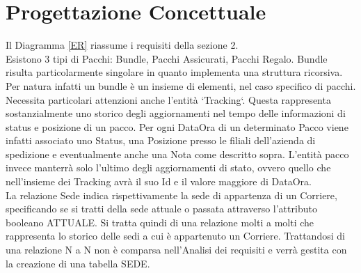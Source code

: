 \section{Progettazione Concettuale}

Il Diagramma \ref{ER} riassume i requisiti della sezione 2.\\ Esistono 3 tipi di Pacchi: Bundle, Pacchi Assicurati, Pacchi Regalo.
Bundle risulta particolarmente singolare in quanto implementa una struttura ricorsiva. Per natura infatti un bundle è un insieme di elementi, nel caso specifico di pacchi.\\
Necessita particolari attenzioni anche l'entità `Tracking`. Questa rappresenta sostanzialmente uno storico degli aggiornamenti nel tempo delle informazioni di status e posizione di un pacco. Per ogni DataOra di un determinato Pacco viene infatti associato uno Status, una Posizione presso le filiali dell'azienda di spedizione e eventualmente anche una Nota come descritto sopra. L'entità pacco invece manterrà solo l'ultimo degli aggiornamenti di stato, ovvero quello che nell'insieme dei Tracking avrà il suo Id e il valore maggiore di DataOra.\\
La relazione Sede indica rispettivamente la sede di appartenza di un Corriere, specificando se si tratti della sede attuale o passata attraverso l'attributo booleano ATTUALE. Si tratta quindi di una relazione molti a molti che rappresenta lo storico delle sedi a cui è appartenuto un Corriere. Trattandosi di una relazione N a N non è comparsa nell'Analisi dei requisiti e verrà gestita con la creazione di una tabella SEDE.
